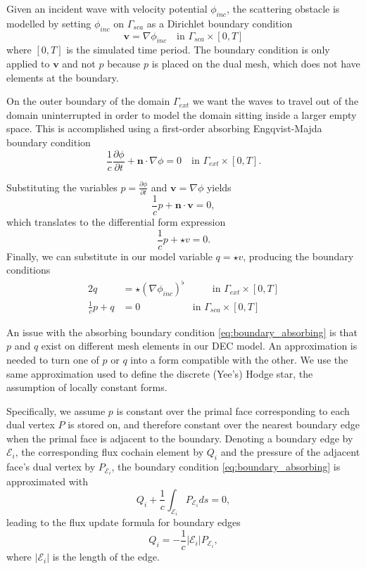 \documentclass[utf8,english]{gradu3}
\begin{document}
Given an incident wave with velocity potential $\phi_{inc}$,
the scattering obstacle is modelled by setting $\phi_{inc}$ on $\Gamma_{sca}$
as a Dirichlet boundary condition
\begin{equation}
  \mathbf{v} = \nabla \phi_{inc}
  \quad \text{in } \Gamma_{sca} \times [0, T]
\end{equation}
where $[0,T]$ is the simulated time period.
The boundary condition is only applied to $\mathbf{v}$
and not $p$ because $p$ is placed on the dual mesh,
which does not have elements at the boundary.

On the outer boundary of the domain $\Gamma_{ext}$
we want the waves to travel out of the domain uninterrupted
in order to model the domain sitting inside a larger empty space.
This is accomplished using a first-order absorbing Engqvist-Majda boundary condition
\parencite{engquist_absorbing_1977}
\[
  \frac{1}{c}\frac{\partial\phi}{\partial t} + \mathbf{n} \cdot \nabla\phi = 0
  \quad \text{in } \Gamma_{ext} \times [0, T].
\]

Substituting the variables $p = \frac{\partial \phi}{\partial t}$
and $\mathbf{v} = \nabla \phi$ yields
\[
  \frac{1}{c}p + \mathbf{n} \cdot \mathbf{v} = 0,
\]
which translates to the differential form expression
\[
  \frac{1}{c}p + \star v = 0.
\]
Finally, we can substitute in our model variable $q = \star v$,
producing the boundary conditions
\begin{alignat}{2}
  \label{eq:boundary_dirichlet}
  q &= \star(\nabla \phi_{inc})^{\flat} & \qquad \text{in } \Gamma_{ext} \times [0, T] \\
  \label{eq:boundary_absorbing}
  \frac{1}{c} p + q &= 0 & \text{in } \Gamma_{sca} \times [0, T]
\end{alignat}

An issue with the absorbing boundary condition \eqref{eq:boundary_absorbing}
is that $p$ and $q$ exist on different mesh elements in our DEC model.
An approximation is needed to turn one of $p$ or $q$ into a form compatible with the other.
We use the same approximation used to define the discrete (Yee's) Hodge star,
the assumption of locally constant forms.

Specifically, we assume $p$ is constant over the primal face corresponding
to each dual vertex $P$ is stored on,
and therefore constant over the nearest boundary edge
when the primal face is adjacent to the boundary.
Denoting a boundary edge by $\mathcal{E}_i$,
the corresponding flux cochain element by $Q_i$
and the pressure of the adjacent face's dual vertex by $P_{\mathcal{E}_i}$,
the boundary condition \eqref{eq:boundary_absorbing} is approximated with
\[
  Q_i + \frac{1}{c} \int_{\mathcal{E}_i} P_{\mathcal{E}_i} ds = 0,
\]
leading to the flux update formula for boundary edges
\begin{equation}
  Q_i = -\frac{1}{c} |\mathcal{E}_i| P_{\mathcal{E}_i},
\end{equation}
where $|\mathcal{E}_i|$ is the length of the edge.
\end{document}
